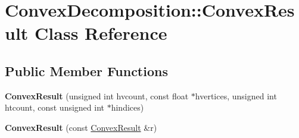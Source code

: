 \hypertarget{class_convex_decomposition_1_1_convex_result}{\section{Convex\+Decomposition\+:\+:Convex\+Result Class Reference}
\label{class_convex_decomposition_1_1_convex_result}
}
\subsection*{Public Member Functions}
\begin{DoxyCompactItemize}
\item 
\hypertarget{class_convex_decomposition_1_1_convex_result_af2d96bc26f1bc45b0ccc21052ed18c67}{{\bfseries Convex\+Result} (unsigned int hvcount, const float $\ast$hvertices, unsigned int htcount, const unsigned int $\ast$hindices)}\label{class_convex_decomposition_1_1_convex_result_af2d96bc26f1bc45b0ccc21052ed18c67}

\item 
\hypertarget{class_convex_decomposition_1_1_convex_result_afc7a0d697c1050875a37986d71cee344}{{\bfseries Convex\+Result} (const \hyperlink{class_convex_decomposition_1_1_convex_result}{Convex\+Result} \&r)}\label{class_convex_decomposition_1_1_convex_result_afc7a0d697c1050875a37986d71cee344}

\end{DoxyCompactItemize}
